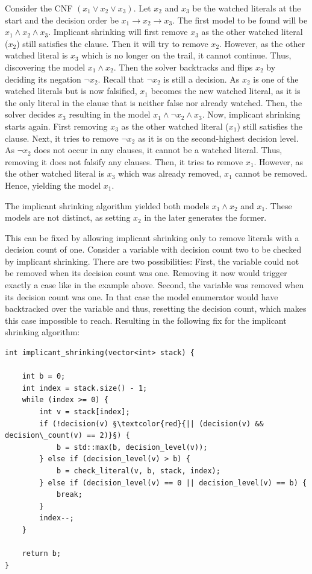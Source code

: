 \documentclass[12pt,a4paper]{article}
\begin{document}
Consider the CNF \((x_1 \lor x_2 \lor x_3)\). Let \(x_2\) and \(x_3\) be the watched literals at the start and the decision order be \(x_1 \to x_2 \to x_3\). The first model to be found will be \(x_1 \land x_2 \land x_3\). Implicant shrinking will first remove \(x_3\) as the other watched literal (\(x_2\)) still satisfies the clause. Then it will try to remove \(x_2\). However, as the other watched literal is \(x_3\) which is no longer on the trail, it cannot continue. Thus, discovering the model \(x_1 \land x_2\). Then the solver backtracks and flips \(x_2\) by deciding its negation \(\lnot x_2\). Recall that \(\lnot x_2\) is still a decision. As \(x_2\) is one of the watched literals but is now falsified, \(x_1\) becomes the new watched literal, as it is the only literal in the clause that is neither false nor already watched. Then, the solver decides \(x_3\) resulting in the model \(x_1 \land \lnot x_2 \land x_3\). Now, implicant shrinking starts again. First removing \(x_3\) as the other watched literal (\(x_1\)) still satisfies the clause. Next, it tries to remove \(\lnot x_2\) as it is on the second-highest decision level. As \(\lnot x_2\) does not occur in any clauses, it cannot be a watched literal. Thus, removing it does not falsify any clauses. Then, it tries to remove \(x_1\). However, as the other watched literal is \(x_3\) which was already removed, \(x_1\) cannot be removed. Hence, yielding the model \(x_1\).

The implicant shrinking algorithm yielded both models \(x_1 \land x_2\) and \(x_1\). These models are not distinct, as setting \(x_2\) in the later generates the former.

This can be fixed by allowing implicant shrinking only to remove literals with a decision count of one. Consider a variable with decision count two to be checked by implicant shrinking. There are two possibilities: First, the variable could not be removed when its decision count was one. Removing it now would trigger exactly a case like in the example above. Second, the variable was removed when its decision count was one. In that case the model enumerator would have backtracked over the variable and thus, resetting the decision count, which makes this case impossible to reach. Resulting in the following fix for the implicant shrinking algorithm:

\begin{verbatim}
int implicant_shrinking(vector<int> stack) {

    int b = 0;
    int index = stack.size() - 1;
    while (index >= 0) {
        int v = stack[index];
        if (!decision(v) §\textcolor{red}{|| (decision(v) && decision\_count(v) == 2)}§) {
            b = std::max(b, decision_level(v));
        } else if (decision_level(v) > b) {
            b = check_literal(v, b, stack, index);
        } else if (decision_level(v) == 0 || decision_level(v) == b) {
            break;
        }
        index--;
    }

    return b;
}
\end{verbatim}
\end{document}
